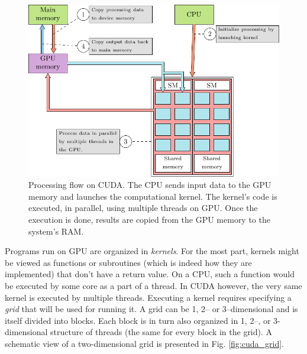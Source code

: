 \begin{figure}[ht]
    \centering
    \includegraphics[width=\textwidth]{figures/cuda_workflow}
    \caption{Processing flow on CUDA. The CPU sends input data to the GPU memory and launches the computational kernel. The kernel's code is executed, in parallel, using multiple threads on GPU. Once the execution is done, results are copied from the GPU memory to the system's RAM.}
    \label{fig:cuda_flow}
\end{figure}

Programs run on GPU are organized in \emph{kernels}. For the most part, kernels might be viewed as
functions or subroutines (which is indeed how they are implemented) that don't have a return value.
On a CPU, such a function would be executed by some core as a part of a thread. In CUDA however, the
very same kernel is executed by multiple threads. Executing a kernel requires specifying a
\emph{grid} that will be used for running it. A grid can be 1, 2-- or 3--dimensional and is itself
divided into blocks. Each block is in turn also organized in 1, 2--, or 3-dimensional structure of
threads (the same for every block in the grid). A schematic view of a two-dimensional grid is
presented in Fig. \ref{fig:cuda_grid}.

